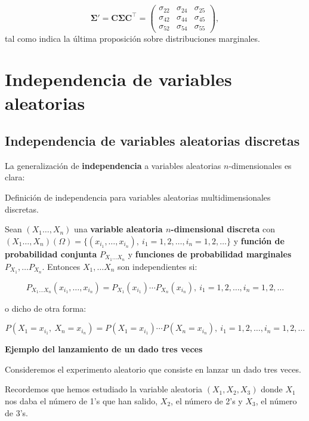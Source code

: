 \documentclass[
  letterpaper,
  DIV=11,
  numbers=noendperiod]{scrreprt}
\begin{document}
\[
\mathbf{\Sigma'}=\mathbf{C}\mathbf{\Sigma}\mathbf{C}^\top = \begin{pmatrix}\sigma_{22} & \sigma_{24} & \sigma_{25}\\ \sigma_{42} & \sigma_{44} & \sigma_{45} \\  \sigma_{52} & \sigma_{54} & \sigma_{55}\end{pmatrix}, 
\] tal como indica la última proposición sobre distribuciones
marginales.

\hypertarget{independencia-de-variables-aleatorias-1}{%
\section{Independencia de variables
aleatorias}\label{independencia-de-variables-aleatorias-1}}

\hypertarget{independencia-de-variables-aleatorias-discretas-1}{%
\subsection{Independencia de variables aleatorias
discretas}\label{independencia-de-variables-aleatorias-discretas-1}}

La generalización de \textbf{independencia} a variables aleatorias
\(n\)-dimensionales es clara:

Definición de independencia para variables aleatorias multidimensionales
discretas.

Sean \((X_1\ldots,X_n)\) una \textbf{variable aleatoria
\(n\)-dimensional discreta} con
\((X_1\ldots,X_n)(\Omega)=\{(x_{i_1},\ldots,x_{i_n}),\ i_1=1,2,\ldots,i_n=1,2,\ldots\}\)
y \textbf{función de probabilidad conjunta} \(P_{X_1\ldots X_n}\) y
\textbf{funciones de probabilidad marginales}
\(P_{X_1},\ldots P_{X_n}\). Entonces \(X_1,\ldots X_n\) son
independientes si:

\[
P_{X_1\ldots X_n}(x_{i_1},\ldots,x_{i_n})=P_{X_1}(x_{i_1})\cdots P_{X_n}(x_{i_n}),\ i_1=1,2,\ldots,i_n=1,2,\ldots
\]

o dicho de otra forma:

\[
P(X_1=x_{i_1},\ X_n=x_{i_n})=P(X_1=x_{i_1})\cdots P(X_n=x_{i_n}),\ i_1=1,2,\ldots,i_n=1,2,\ldots
\]

\textbf{Ejemplo del lanzamiento de un dado tres veces}

Consideremos el experimento aleatorio que consiste en lanzar un dado
tres veces.

Recordemos que hemos estudiado la variable aleatoria \((X_1,X_2,X_3)\)
donde \(X_1\) nos daba el número de 1's que han salido, \(X_2\), el
número de 2's y \(X_3\), el número de 3's.
\end{document}
